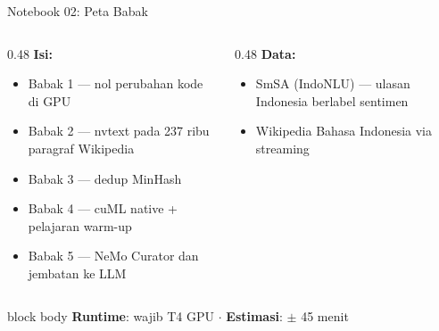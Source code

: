 \documentclass[aspectratio=169,t]{beamer}
\begin{document}
\begin{frame}{Notebook 02: Peta Babak}
  \begin{columns}[T]
    \begin{column}{0.48\textwidth}
      \textcolor{nvorange}{\textbf{Isi:}}
      \begin{itemize}
        \footnotesize
        \item Babak 1 --- nol perubahan kode di GPU
        \item Babak 2 --- nvtext pada 237 ribu paragraf Wikipedia
        \item Babak 3 --- dedup MinHash
        \item Babak 4 --- cuML native + pelajaran warm-up
        \item Babak 5 --- NeMo Curator dan jembatan ke LLM
      \end{itemize}
    \end{column}
    \begin{column}{0.48\textwidth}
      \textcolor{nvlightgreen}{\textbf{Data:}}
      \begin{itemize}
        \footnotesize
        \item SmSA (IndoNLU) --- ulasan Indonesia berlabel sentimen
        \item Wikipedia Bahasa Indonesia via streaming
      \end{itemize}
    \end{column}
  \end{columns}
  \vspace{0.5em}
  \begin{beamercolorbox}[rounded=true,shadow=false,sep=4pt]{block body}
    \small\color{white}
    \textbf{Runtime}: wajib T4 GPU \quad $\cdot$ \quad \textbf{Estimasi}: $\pm$ 45 menit
  \end{beamercolorbox}
\end{frame}
\end{document}
